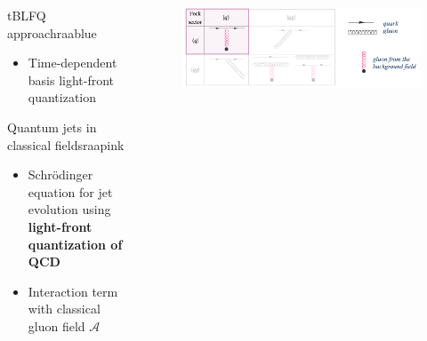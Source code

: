\documentclass[aspectratio=169,11pt,usenames,dvipsnames]{beamer}
\begin{document}
\begin{frame}
\begin{center}
\begin{columns}[onlytextwidth,t]
            \begin{center}
                \begin{custombox2}{\normalsize tBLFQ approach}{raablue}
                    \small
                    \begin{varwidth}{0.91\textwidth}
                    \begin{itemize}\itemsep0em 
                        \itemsep0em
                        \footnotesize
                        \item Time-dependent basis light-front quantization
                    \end{itemize}
                    \end{varwidth}
                \end{custombox2}
                \begin{custombox2}{\normalsize Quantum jets in classical fields}{raapink}
                    \small
                    \begin{varwidth}{0.91\textwidth}
                    \begin{itemize}\itemsep0em 
                        \itemsep0em
                        \footnotesize
                        \item Schr\"{o}dinger equation for jet evolution using {\bfseries\color{raapink} light-front quantization of QCD}
                        \item Interaction term with classical gluon field $\mathcal{A}$
                    \end{itemize}
                    \end{varwidth}
                \end{custombox2}
            \end{center}
            \vspace{-10pt}
            \begin{figure}
                \centering
                \includegraphics[width=0.95\columnwidth]{images/tblfq_sectors_onlyq.png}

\end{figure}
\end{columns}
\end{center}
\end{frame}
\end{document}
